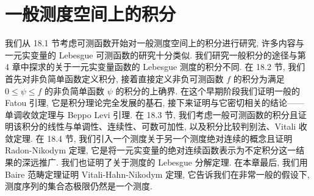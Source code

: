 \documentclass[../main.tex]{subfiles}
\begin{document}
\chapter{一般测度空间上的积分}\label{chapter:ch18-integration}

我们从 18.1 节考虑可测函数开始对一般测度空间上的积分进行研究, 许多内容与一元实变量的 Lebesgue 可测函数的研究十分类似. 我们研究一般积分的途径与第 4 章中探求的关于一元实变量函数的 Lebesgue 测度的积分不同. 在 18.2 节, 我们首先对非负简单函数定义积分, 接着直接定义非负可测函数 $f$ 的积分为满足 $0\leqslant\psi\leqslant f$ 的非负简单函数 $\psi$ 的积分的上确界. 在这个早期阶段我们证明一般的 Fatou 引理, 它是积分理论完全发展的基石, 接下来证明与它密切相关的结论——单调收敛定理与 Beppo Levi 引理. 在 18.3 节, 我们考虑一般可测函数的积分且证明该积分的线性与单调性、连续性、可数可加性, 以及积分比较判别法、Vitali 收敛定理. 在 18.4 节, 我们引入一个测度关于另一个测度绝对连续的概念且证明 Radon-Nikodym 定理, 它是将一元实变量的绝对连续函数表示为不定积分这一结果的深远推广. 我们也证明了关于测度的 Lebesgue 分解定理. 在本章最后, 我们用 Baire 范畴定理证明 Vitali-Hahn-Nikodym 定理, 它告诉我们在非常一般的假设下, 测度序列的集合态极限仍然是一个测度.










\end{document}
